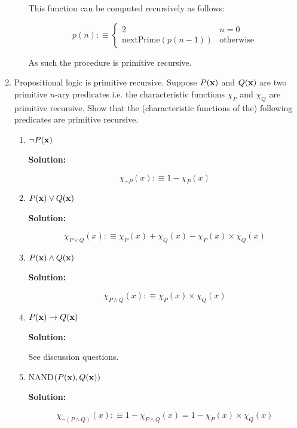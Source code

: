 \documentclass[11pt]{report}
\begin{document}
\begin{enumerate}
\begin{enumerate}
			This function can be computed recursively as follows: 

			$$p(n) :\equiv \begin{cases}
				2 & n = 0 \\
				\text{nextPrime}(p(n-1)) & \text{otherwise}
			\end{cases}$$

			As such the procedure is primitive recursive. 

		\end{enumerate}
	
	\newpage
	\item Propositional logic is primitive recursive. Suppose $P({\bf x})$ and $Q({\bf x})$ are two primitive $n$-ary predicates i.e. the characteristic functions $\chi_{P}$ and $\chi_{Q}$ are primitive recursive. Show that the (characteristic functions of the) following predicates are primitive recursive. 
		
		\begin{enumerate}
			\item $\lnot P({\bf x})$
			
			{\bf Solution:}

			$$\chi_{\lnot P}(x) :\equiv 1 - \chi_{P}(x)$$

			\item $P({\bf x}) \lor Q({\bf x})$
			
			{\bf Solution:}

			$$\chi_{P \lor Q}(x) :\equiv \chi_{P}(x) + \chi_{Q}(x) - \chi_{P}(x) \times \chi_{Q}(x)$$
			 
			\item $P({\bf x}) \land Q({\bf x})$ 
			
			{\bf Solution:}

			$$\chi_{P \land Q}(x) :\equiv \chi_{P}(x) \times \chi_{Q}(x)$$
			
			\item $P({\bf x}) \to Q({\bf x})$
			
			{\bf Solution:}

			See discussion questions. 
			
			\item NAND$(P({\bf x}), Q({\bf x}))$
			
			{\bf Solution:}

			$$\chi_{\lnot (P \land Q)}(x) :\equiv 1 - \chi_{P \land Q}(x) = 1 - \chi_{P}(x) \times \chi_{Q}(x)$$
			
		\end{enumerate}


\end{enumerate}
	
\end{document}
